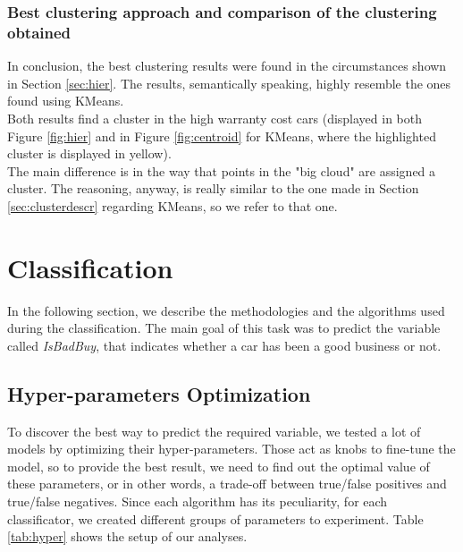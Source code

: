 \documentclass{article}
\begin{document}
	
	\subsubsection{Best clustering approach and comparison of the clustering obtained}
	In conclusion, the best clustering results were found in the circumstances shown in Section \ref{sec:hier}. The results, semantically speaking, highly resemble the ones found using KMeans.\\ Both results find a cluster in the high warranty cost cars (displayed in both Figure \ref{fig:hier} and in Figure \ref{fig:centroid} for KMeans, where the highlighted cluster is displayed in yellow).\\
	The main difference is in the way that points in the "big cloud" are assigned a cluster. The reasoning, anyway, is really similar to the one made in Section \ref{sec:clusterdescr} regarding KMeans, so we refer to that one.
	
	
	
	\newpage
	\section{Classification}
	\label{sec:classification}
	In the following section, we describe the methodologies and the algorithms used during the classification. The main goal of this task was to predict the variable called \textit{IsBadBuy}, that indicates whether a car has been a good business or not.
	
	\subsection{Hyper-parameters Optimization}
	To discover the best way to predict the required variable, we tested a lot of models by optimizing their hyper-parameters. Those act as knobs to fine-tune the model, so to provide the best result, we need to find out the optimal value of these parameters, or in other words, a trade-off between true/false positives and true/false negatives. Since each algorithm has its peculiarity, for each classificator, we created different groups of parameters to experiment. Table \ref{tab:hyper} shows the setup of our analyses.
	
\end{document}

